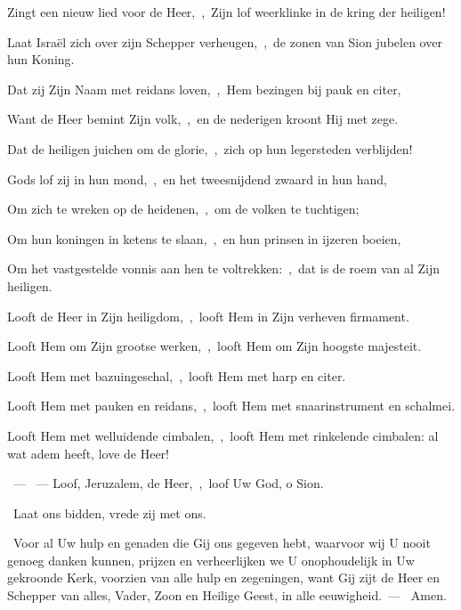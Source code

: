 \documentclass[12pt,twoside,a5paper]{article}
\begin{document}
\begin{halfparskip}
   Zingt een nieuw lied voor de Heer,~\sep\ Zijn lof weerklinke in de kring der heiligen!

  Laat Israël zich over zijn Schepper verheugen,~\sep\ de zonen van Sion jubelen over hun Koning.

  Dat zij Zijn Naam met reidans loven,~\sep\ Hem bezingen bij pauk en citer,

  Want de Heer bemint Zijn volk,~\sep\ en de nederigen kroont Hij met zege.

  Dat de heiligen juichen om de glorie,~\sep\ zich op hun legersteden verblijden!

  Gods lof zij in hun mond,~\sep\ en het tweesnijdend zwaard in hun hand,

  Om zich te wreken op de heidenen,~\sep\ om de volken te tuchtigen;

  Om hun koningen in ketens te slaan,~\sep\ en hun prinsen in ijzeren boeien,

  Om het vastgestelde vonnis aan hen te voltrekken:~\sep\ dat is de roem van al Zijn heiligen.
\end{halfparskip}

\begin{halfparskip}
   Looft de Heer in Zijn heiligdom,~\sep\ looft Hem in Zijn verheven firmament.

  Looft Hem om Zijn grootse werken,~\sep\ looft Hem om Zijn hoogste majesteit.

  Looft Hem met bazuingeschal,~\sep\ looft Hem met harp en citer.

  Looft Hem met pauken en reidans,~\sep\ looft Hem met snaarinstrument en schalmei.

  Looft Hem met welluidende cimbalen,~\sep\ looft Hem met rinkelende cimbalen: al wat adem heeft, love de Heer!
\end{halfparskip}

\begin{halfparskip}
  ~--- ~---  Loof, Jeruzalem, de Heer,~\sep\ loof Uw God, o Sion.
\end{halfparskip}

\begin{halfparskip}
  \dd~Laat ons bidden, vrede zij met ons.

  \cc~Voor al Uw hulp en genaden die Gij ons gegeven hebt, waarvoor wij U nooit genoeg danken kunnen, prijzen en verheerlijken we U onophoudelijk in Uw gekroonde Kerk, voorzien van alle hulp en zegeningen, want Gij zijt de Heer en Schepper van alles, Vader, Zoon en Heilige Geest, in alle eeuwigheid.~--- \rr~Amen.
\end{halfparskip}
\end{document}
